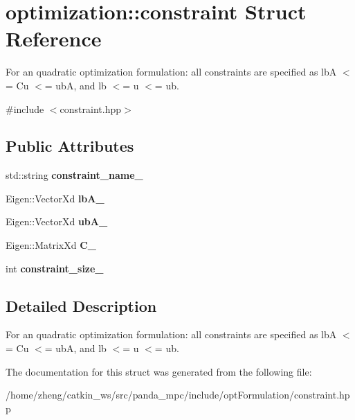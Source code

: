 \hypertarget{structoptimization_1_1constraint}{}\section{optimization\+:\+:constraint Struct Reference}
\label{structoptimization_1_1constraint}


For an quadratic optimization formulation\+: all constraints are specified as lbA $<$= Cu $<$= ubA, and lb $<$= u $<$= ub.  




{\ttfamily \#include $<$constraint.\+hpp$>$}

\subsection*{Public Attributes}
\begin{DoxyCompactItemize}
\item 
\mbox{\label{structoptimization_1_1constraint_a2f2c3774ce86dcee9e2f6ca565c098da}} 
std\+::string {\bfseries constraint\+\_\+name\+\_\+}
\item 
\mbox{\label{structoptimization_1_1constraint_a3b316d4969389b05f1d39ab7ae2f631e}} 
Eigen\+::\+Vector\+Xd {\bfseries lb\+A\+\_\+}
\item 
\mbox{\label{structoptimization_1_1constraint_aeacccb87c3cb048c229be1cf35530683}} 
Eigen\+::\+Vector\+Xd {\bfseries ub\+A\+\_\+}
\item 
\mbox{\label{structoptimization_1_1constraint_aff91946c633acfe5acc274ef0f5e68b9}} 
Eigen\+::\+Matrix\+Xd {\bfseries C\+\_\+}
\item 
\mbox{\label{structoptimization_1_1constraint_a77abc1e8e63127e115688810737ceace}} 
int {\bfseries constraint\+\_\+size\+\_\+}
\end{DoxyCompactItemize}


\subsection{Detailed Description}
For an quadratic optimization formulation\+: all constraints are specified as lbA $<$= Cu $<$= ubA, and lb $<$= u $<$= ub. 

The documentation for this struct was generated from the following file\+:\begin{DoxyCompactItemize}
\item 
/home/zheng/catkin\+\_\+ws/src/panda\+\_\+mpc/include/opt\+Formulation/constraint.\+hpp\end{DoxyCompactItemize}
